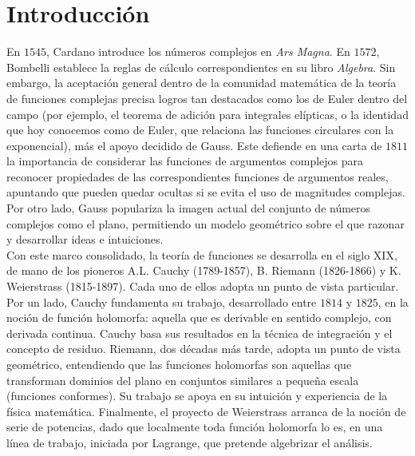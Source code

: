 %
%

\chapter{Introducción}
\label{cap:introduccion}

En $1545$, Cardano introduce los números complejos en  \textit{Ars Magna}. En $1572$, Bombelli establece la reglas de cálculo correspondientes en su libro \textit{Algebra}. Sin embargo, la aceptación general dentro de la comunidad matemática de la teoría de funciones complejas precisa logros tan destacados como los de Euler dentro del campo (por ejemplo, el teorema de adición para integrales elípticas, o la identidad que hoy conocemos como de Euler, que relaciona las funciones circulares con la exponencial), más el apoyo decidido de Gauss. Este defiende en una carta de $1811$ la importancia de considerar las funciones de argumentos complejos para reconocer propiedades de las correspondientes funciones de argumentos reales, apuntando que pueden quedar ocultas si se evita el uso de magnitudes complejas. Por otro lado, Gauss populariza la imagen actual del conjunto de números complejos como el plano, permitiendo un modelo geométrico sobre el que razonar y desarrollar ideas e intuiciones. \\

Con este marco consolidado, la teoría de funciones se desarrolla en el siglo XIX, de mano de los pioneros A.L. Cauchy (1789-1857), B. Riemann (1826-1866) y K. Weierstrass (1815-1897). Cada uno de ellos adopta un punto de vista particular. Por un lado, Cauchy fundamenta su trabajo, desarrollado entre $1814$ y $1825$, en la noción de función holomorfa: aquella que es derivable en sentido complejo, con derivada continua. Cauchy basa sus resultados en la técnica de integración y el concepto de residuo. Riemann, dos décadas más tarde, adopta un punto de vista geométrico, entendiendo que las funciones holomorfas son aquellas que transforman dominios del plano en conjuntos similares a pequeña escala (funciones conformes). Su trabajo se apoya en su intuición y experiencia de la física matemática. Finalmente, el proyecto de Weierstrass arranca de la noción de serie de potencias, dado que localmente toda función holomorfa lo es, en una línea de trabajo, iniciada por Lagrange, que pretende algebrizar el análisis. \\

